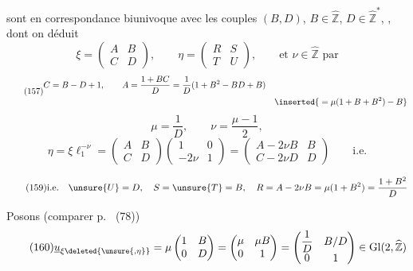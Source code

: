 
sont en correspondance biunivoque avec les couples $(B,D)$, $B\in\widehat{\mathbb Z}$, $D\in\widehat{\mathbb Z}^{*}$, , dont on déduit
\[
\xi=\begin{pmatrix}A&B\\C&D\end{pmatrix},\qquad
\eta=\begin{pmatrix}R&S\\T&U\end{pmatrix},\qquad
\text{et }\nu\in\widehat{\mathbb Z}\text{ par}
\]
\[
\tag{157}
\begin{aligned}
C&=B-D+1,\qquad
A=\frac{1+BC}{D}=\frac1D(1+B^2-BD+B)\\
&&\inserted{{}=\mu(1+B+B^2)-B}
\end{aligned}
\]
\[
\tag{158}
\mu=\frac1D,\qquad\nu=\frac{\mu-1}{2},
\]
\[
\eta=\xi\ell_1^{-\nu}
=\begin{pmatrix}A&B\\C&D\end{pmatrix}
\begin{pmatrix}1&0\\-2\nu&1\end{pmatrix}
=\begin{pmatrix}A-2\nu B&B\\C-2\nu D&D\end{pmatrix}
\qquad\text{i.e.}
\]


\[
\tag{159}
\text{i.e.}\quad
\unsure{U}=D,\quad S=\unsure{T}=B,\quad
R=A-2\nu B=\mu(1+B^2)=\frac{1+B^2}{D}
\]

Posons (comparer p.~ (78))
\[
\tag{160}
\underline u_{\xi\deleted{\unsure{,\eta}}}
=\mu\begin{pmatrix}1&B\\0&D\end{pmatrix}
=\begin{pmatrix}\mu&\mu B\\0&1\end{pmatrix}
=\begin{pmatrix}\dfrac1D&B/D\\0&1\end{pmatrix}
\in\mathrm{Gl}(2,\widehat{\mathbb Z})
\]

